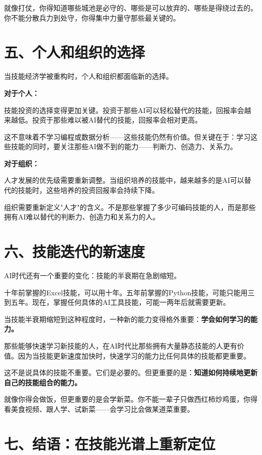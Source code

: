就像打仗，你得知道哪些城池是必守的、哪些是可以放弃的、哪些是得绕过去的。你不能分散兵力到处守，你得集中力量守那些最关键的。

\section{五、个人和组织的选择}


当技能经济学被重构时，个人和组织都面临新的选择。

\textbf{对于个人：}

技能投资的选择变得更加关键。投资于那些AI可以轻松替代的技能，回报率会越来越低。投资于那些难以被AI替代的技能，回报率会相对更高。

这不意味着不学习编程或数据分析——这些技能仍然有价值。但关键在于：学习这些技能的同时，要关注那些AI做不到的能力——判断力、创造力、关系力。

\textbf{对于组织：}

人才发展的优先级需要重新调整。当组织培养的技能中，越来越多的是AI可以替代的技能时，这些培养的投资回报率会持续下降。

组织需要重新定义"人才"的含义。不是那些掌握了多少可编码技能的人，而是那些拥有AI难以替代的判断力、创造力和关系力的人。

\section{六、技能迭代的新速度}


AI时代还有一个重要的变化：技能的半衰期在急剧缩短。

十年前掌握的Excel技能，可以用十年。五年前掌握的Python技能，可能只能用三到五年。现在，掌握任何具体的AI工具技能，可能一两年后就需要更新。

当技能半衰期缩短到这种程度时，一种新的能力变得格外重要：\textbf{学会如何学习的能力。}

那些能够快速学习新技能的人，在AI时代比那些拥有大量静态技能的人更有价值。因为当技能更新速度加快时，快速学习的能力比任何具体的技能都更重要。

这不是说具体的技能不重要。它们是必要的。但更重要的是：\textbf{知道如何持续地更新自己的技能组合的能力。}

就像你得会做饭，但更重要的是会学新菜。你不能一辈子只做西红柿炒鸡蛋，你得看美食视频、跟人学、试新菜——会学习比会做某道菜重要。

\section{七、结语：在技能光谱上重新定位}


